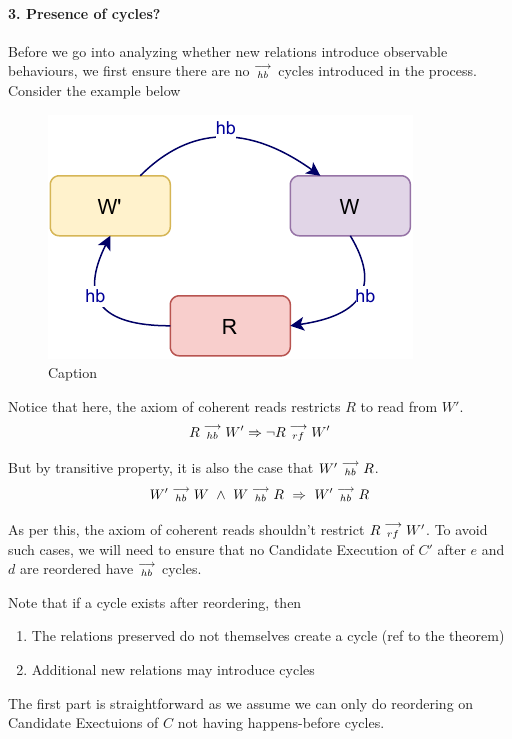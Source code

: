
\paragraph{3. Presence of cycles?}
    Before we go into analyzing whether new relations introduce observable behaviours, we first ensure there are no $\stackrel{\longrightarrow}{_\textit{hb}}$ cycles introduced in the process. Consider the example below
    \begin{figure}[H]
        \centering
        \includegraphics[scale=0.7]{InstructionReordering/ValidReorderingProof/ProofParts/Part3/part3(a).pdf}
        \caption{Caption}
        \label{fig:my_label}
    \end{figure}

    Notice that here, the axiom of coherent reads restricts $R$ to read from $W'$.
    \[
        R\stackrel{\longrightarrow}{_{hb}}W' \Rightarrow \neg R\stackrel{\longrightarrow}{_{rf}}W'
    \]

    But by transitive property, it is also the case that $W'\stackrel{\longrightarrow}{_{hb}}R$. 
    \[
        \reln{W'}{hb}{W} \ \wedge \ \reln{W}{hb}{R} \ 
        \Rightarrow \ 
        \reln{W'}{hb}{R}
    \]

    As per this, the axiom of coherent reads shouldn't restrict $R\stackrel{\longrightarrow}{_{rf}}W'$. To avoid such cases, we will need to ensure that no Candidate Execution of $C'$ after $e$ and $d$ are reordered have $\stackrel{\longrightarrow}{_{hb}}$ cycles.

    Note that if a cycle exists after reordering, then 
    \begin{enumerate}
        \item The relations preserved do not themselves create a cycle (ref to the theorem)
        \item Additional new relations may introduce cycles
    \end{enumerate}

    The first part is straightforward as we assume we can only do reordering on Candidate Exectuions of $C$ not having happens-before cycles. 

